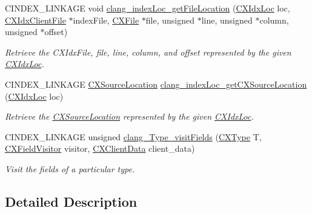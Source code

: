 \begin{DoxyCompactItemize}
C\+I\+N\+D\+E\+X\+\_\+\+L\+I\+N\+K\+A\+GE void \mbox{\hyperlink{group__CINDEX__HIGH_ga340d2dda7a0d3430fe9929034c1b712c}{clang\+\_\+index\+Loc\+\_\+get\+File\+Location}} (\mbox{\hyperlink{structCXIdxLoc}{C\+X\+Idx\+Loc}} loc, \mbox{\hyperlink{group__CINDEX__HIGH_ga6fd9c59c0b0a0a21622e5bcfc08156cc}{C\+X\+Idx\+Client\+File}} $\ast$index\+File, \mbox{\hyperlink{group__CINDEX__FILES_gacfcea9c1239c916597e2e5b3e109215a}{C\+X\+File}} $\ast$file, unsigned $\ast$line, unsigned $\ast$column, unsigned $\ast$offset)
\begin{DoxyCompactList}\small\item\em Retrieve the C\+X\+Idx\+File, file, line, column, and offset represented by the given \mbox{\hyperlink{structCXIdxLoc}{C\+X\+Idx\+Loc}}. \end{DoxyCompactList}\item 
\mbox{\label{group__CINDEX__HIGH_ga89d0ff9816ec25f6d68edc5cbc908c20}} 
C\+I\+N\+D\+E\+X\+\_\+\+L\+I\+N\+K\+A\+GE \mbox{\hyperlink{structCXSourceLocation}{C\+X\+Source\+Location}} \mbox{\hyperlink{group__CINDEX__HIGH_ga89d0ff9816ec25f6d68edc5cbc908c20}{clang\+\_\+index\+Loc\+\_\+get\+C\+X\+Source\+Location}} (\mbox{\hyperlink{structCXIdxLoc}{C\+X\+Idx\+Loc}} loc)
\begin{DoxyCompactList}\small\item\em Retrieve the \mbox{\hyperlink{structCXSourceLocation}{C\+X\+Source\+Location}} represented by the given \mbox{\hyperlink{structCXIdxLoc}{C\+X\+Idx\+Loc}}. \end{DoxyCompactList}\item 
C\+I\+N\+D\+E\+X\+\_\+\+L\+I\+N\+K\+A\+GE unsigned \mbox{\hyperlink{group__CINDEX__HIGH_ga18285a2cefecf5a069c64e675b627273}{clang\+\_\+\+Type\+\_\+visit\+Fields}} (\mbox{\hyperlink{structCXType}{C\+X\+Type}} T, \mbox{\hyperlink{group__CINDEX__HIGH_ga5040863c91d7a720a97569cf869f42a4}{C\+X\+Field\+Visitor}} visitor, \mbox{\hyperlink{group__CINDEX_gacfa40c3de26d228c0d898403c2c21612}{C\+X\+Client\+Data}} client\+\_\+data)
\begin{DoxyCompactList}\small\item\em Visit the fields of a particular type. \end{DoxyCompactList}\end{DoxyCompactItemize}


\subsection{Detailed Description}


